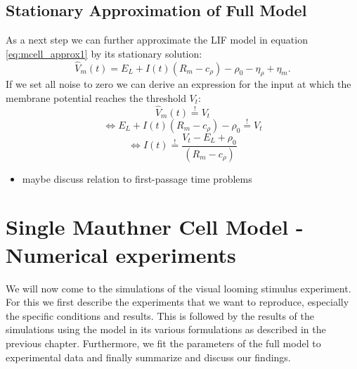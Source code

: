 \documentclass[a4paper,10pt,hidelinks]{scrreprt}
\begin{document}
	\section{Stationary Approximation of Full Model}
	As a next step we can further approximate the LIF model in equation \ref{eq:mcell_approx1} by 
	its stationary solution:
	\begin{equation}
	\hat{V}_m(t) = E_{L} + I(t)(R_{m} - c_{\rho}) - \rho_{0} - 
	\eta_{\rho} +  \eta _m.
	\end{equation}
	If we set all noise to zero we can derive an expression for the input at which the membrane 
	potential reaches the threshold $V_{t}$:
	\begin{equation}
	\hat{V}_m(t) \overset{!}{=} V_t
	\end{equation}
	\begin{equation}
	\Leftrightarrow E_{L} + I(t)(R_{m} - c_{\rho}) - \rho_{0} 
	\overset{!}{=} V_t
	\end{equation}
	\begin{equation}
	\Leftrightarrow I(t)
	\overset{!}{=} \frac{V_t - E_{L} + \rho_{0}}{(R_{m} - c_{\rho})}
	\label{eq:crit_input}
	\end{equation}
	\begin{itemize}
		\item maybe discuss relation to first-passage time problems
	\end{itemize}


	\chapter{Single Mauthner Cell Model - Numerical experiments}
	We will now come to the simulations of the visual looming stimulus experiment.
	For this we first describe the experiments that we want to reproduce, especially the specific 
	conditions and results.
	This is followed by the results of the simulations using the model in its various formulations 
	as described in the previous chapter.
	Furthermore, we fit the parameters of the full model to experimental data and finally summarize 
	and discuss our findings.
\end{document}
